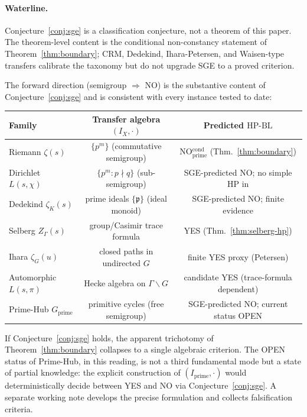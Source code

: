 \documentclass[11pt]{article}
\theoremstyle{definition}
\theoremstyle{remark}
\newcommand{\HBL}{\mathrm{HP\text{-}BL}}
\begin{document}
\paragraph{Waterline.}
Conjecture~\ref{conj:sge} is a classification conjecture, not a
theorem of this paper. The theorem-level content is the conditional
non-constancy statement of Theorem~\ref{thm:boundary}; CRM, Dedekind,
Ihara-Petersen, and Waisen-type transfers calibrate the taxonomy but do
not upgrade SGE to a proved criterion.

The forward direction (semigroup $\Rightarrow$ NO) is the substantive
content of Conjecture~\ref{conj:sge} and is consistent with every
instance tested to date:

\begin{center}
\begin{tabular}{@{}lcc@{}}
\toprule
Family & Transfer algebra $(I_X, \cdot)$ & Predicted $\HBL$ \\
\midrule
Riemann $\zeta(s)$ & $\{p^m\}$ (commutative semigroup) & NO$_{\mathrm{prime}}^{\mathrm{cond}}$ (Thm.~\ref{thm:boundary}) \\
Dirichlet $L(s,\chi)$ & $\{p^m : p \nmid q\}$ (sub-semigroup) & SGE-predicted NO; no simple HP in \cite{PaleyWienerDirichlet} \\
Dedekind $\zeta_K(s)$ & prime ideals $\{\mathfrak{p}\}$ (ideal monoid) & SGE-predicted NO; finite evidence \\
Selberg $Z_\Gamma(s)$ & group/Casimir trace formula & YES (Thm.~\ref{thm:selberg-hp}) \\
Ihara $\zeta_G(u)$ & closed paths in undirected $G$ & finite YES proxy (Petersen) \\
Automorphic $L(s,\pi)$ & Hecke algebra on $\Gamma\backslash G$ & candidate YES (trace-formula dependent) \\
Prime-Hub $G_\mathrm{prime}$ & primitive cycles (free semigroup) & SGE-predicted NO; current status OPEN \\
\bottomrule
\end{tabular}
\end{center}

If Conjecture~\ref{conj:sge} holds, the apparent trichotomy of
Theorem~\ref{thm:boundary} collapses to a single algebraic criterion.
The OPEN status of Prime-Hub, in this reading, is not a third
fundamental mode but a state of partial knowledge: the explicit
construction of $(I_\mathrm{prime}, \cdot)$ would deterministically
decide between YES and NO via Conjecture~\ref{conj:sge}. A separate
working note \cite{SGENote} develops the precise formulation and
collects falsification criteria.
\end{document}
